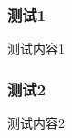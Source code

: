 \documentclass{ctexbeamer}
\begin{document}
    \begin{frame}
        \frametitle{测试1}
    
        测试内容1
    
    \end{frame}

    \begin{frame}
        \frametitle{测试2}
    
        测试内容2
    
    \end{frame}
\end{document}
